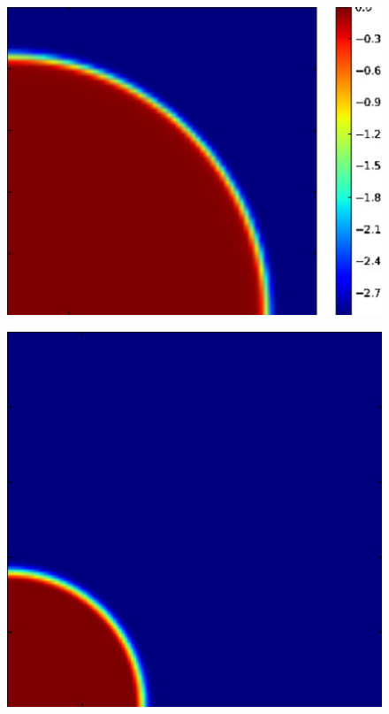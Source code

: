 \begin{figure}[t]
{  \hspace{0.1cm}
  \includegraphics[scale=0.3]{i1-HIIcontour_500myr_nx64.pdf}
  \hfill}
\vspace{0.2cm}
\centerline{\hfill
  \includegraphics[scale=0.3]{i1-HIIcontour_10myr_nx128.pdf}
}
\end{figure}
